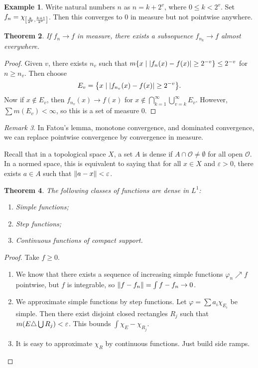 \documentclass[leqno, openany]{memoir}
\newtheorem{thm}{Theorem}[chapter]
\theoremstyle{definition}
\newtheorem{exm}[thm]{Example}
\theoremstyle{remark}
\newtheorem{rmk}[thm]{Remark}
\theoremstyle{plain}
\theoremstyle{definition}
\theoremstyle{remark}
\newcommand{\ep}{\varepsilon}
\newcommand{\mc}[1]{\mathcal{#1}}
\begin{document}
\begin{exm} Write natural numbers $n$ as $n = k + 2^v$, where $0 \leq k < 2^v$.
Set $f_n = \chi_{\qty[\frac{k}{2^v}, \frac{k+1}{2^v}]}$. Then this converges to
$0$ in measure but not pointwise anywhere.  \end{exm}

\begin{thm} If $f_n \to f$ in measure, there exists a subsequence $f_{n_k} \to
f$ almost everywhere.  \end{thm}

\begin{proof} Given $v$, there exists $n_v$ such that $m \qty{x \mid
    \abs{f_n(x) - f(x)} \geq 2^{-v}} \leq 2^{-v}$ for $n \geq n_v$. Then choose
    \[ E_v = \qty{x \mid \abs{f_{n_v}(x) - f(x)} \geq 2^{-v}}. \] Now if $x
    \notin E_v$, then $f_{n_v}(x) \to f(x)$ for $x \notin
    \bigcap_{k=1}^{\infty} \bigcup_{v = k}^{\infty} E_v$. However, $\sum m(E_v)
    < \infty$, so this is a set of measure $0$.  \end{proof}

\begin{rmk} In Fatou's lemma, monotone convergence, and dominated convergence,
we can replace pointwise convergence by convergence in measure.  \end{rmk}

Recall that in a topological space $X$, a set $A$ is dense if $A \cap \mc{O}
\neq \emptyset$ for all open $\mc{O}$. In a normed space, this is equivalent to
saying that for all $x \in X$ and $\ep > 0$, there exists $a \in A$ such that
$\norm{a-x} < \ep$.

\begin{thm} The following classes of functions are dense in $L^1$:
\begin{enumerate} \item Simple functions; \item Step functions; \item
Continuous functions of compact support.  \end{enumerate} \end{thm}

\begin{proof} Take $f \geq 0$.  \begin{enumerate} \item We know that there
    exists a sequence of increasing simple functions $\varphi_n \nearrow f$
    pointwise, but $f$ is integrable, so $\norm{f-f_n} = \int f-f_n \to 0$.
\item We approximate simple functions by step functions. Let $\varphi = \sum
    a_i \chi_{E_i}$ be simple. Then there exist disjoint closed rectangles
    $R_j$ such that $m\qty(E \triangle \bigcup R_j) < \ep$. This bounds $\int
    \chi_E - \chi_{R_j}$.  \item It is easy to approximate $\chi_R$ by
    continuous functions. Just build side ramps.  \end{enumerate} \end{proof}
\end{document}
